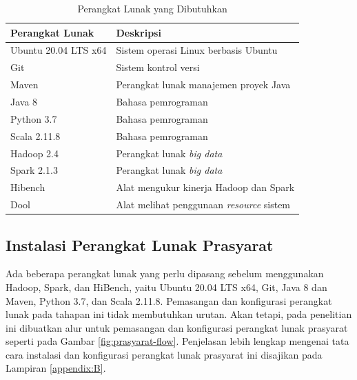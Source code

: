 \begin{table}[h!]
	\centering
	\caption{Perangkat Lunak yang Dibutuhkan}
		\begin{tabular}{l p{9cm}} 
		\toprule
			\textbf{Perangkat Lunak} & {\textbf{Deskripsi}}\\ 
            \midrule
			Ubuntu 20.04 LTS x64     & Sistem operasi Linux berbasis Ubuntu  \\ 
			Git                      & Sistem kontrol versi  \\
			Maven                    & Perangkat lunak manajemen proyek Java                            \\ 
			Java 8                   & Bahasa pemrograman                                 \\ 
			Python 3.7               &  Bahasa pemrograman                                                                                                                      \\
			Scala 2.11.8               & Bahasa pemrograman                                                                                                                       \\
			Hadoop 2.4                & Perangkat lunak \textit{big data}\\ 
			Spark 2.1.3               & Perangkat lunak \textit{big data} \\ 
			Hibench   & Alat mengukur kinerja Hadoop dan Spark                                                            \\
			Dool   & Alat melihat penggunaan \textit{resource} sistem                                                             \\
            \bottomrule 
		\end{tabular}
	\label{table:software-needs}
\end{table}


\subsection{Instalasi Perangkat Lunak Prasyarat}
Ada beberapa perangkat lunak yang perlu dipasang sebelum menggunakan Hadoop, Spark, dan HiBench, yaitu Ubuntu 20.04 LTS x64, Git, Java 8 dan Maven, Python 3.7, dan Scala 2.11.8. Pemasangan dan konfigurasi perangkat lunak pada tahapan ini tidak membutuhkan urutan. Akan tetapi, pada penelitian ini dibuatkan alur untuk pemasangan dan konfigurasi perangkat lunak prasyarat seperti pada Gambar \ref{fig:prasyarat-flow}. Penjelasan lebih lengkap mengenai tata cara instalasi dan konfigurasi perangkat lunak prasyarat ini disajikan pada Lampiran \ref{appendix:B}. 

